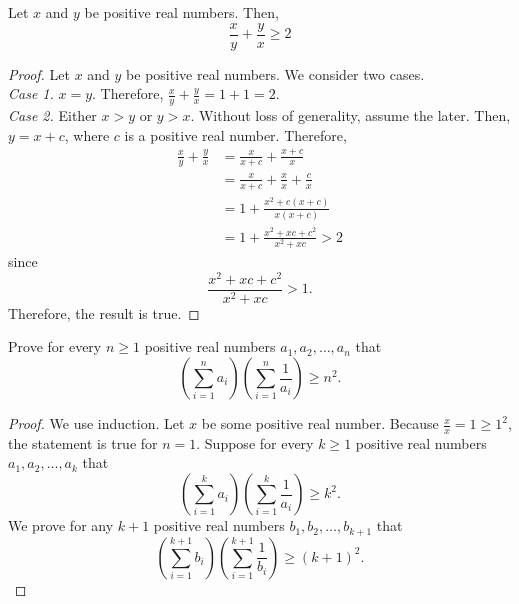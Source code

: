 \documentclass[12pt]{article}
\newenvironment{lemma}[2][Lemma]{\begin{trivlist}
		\item[\hskip \labelsep {\bfseries #1}\hskip \labelsep {\bfseries #2.}]}{\end{trivlist}}
\newenvironment{result}[2][Result]{\begin{trivlist}
		\item[\hskip \labelsep {\bfseries #1}\hskip \labelsep {\bfseries #2.}]}{\end{trivlist}}
\newenvironment{problem}[2][Problem]{\begin{trivlist}
		\item[\hskip \labelsep {\bfseries #1}\hskip \labelsep {\bfseries #2.}]}{\end{trivlist}}
\begin{document}
\begin{problem}{31}

	\begin{lemma}{2}
		Let $x$ and $y$ be positive real numbers. Then, 
		\begin{equation*}
			\frac{x}{y} + \frac{y}{x} \geq 2
		\end{equation*}
	\begin{proof}
		Let $x$ and $y$ be positive real numbers. We consider two cases.\\
		\textit{Case 1.} $x=y$. Therefore, $\frac{x}{y} + \frac{y}{x} = 1 + 1 =2$.\\
		\textit{Case 2.} Either $x>y$ or $y>x$. Without loss of generality, assume the later. Then, $y = x+c$, where $c$ is a positive real number. Therefore,
		\begin{align*}
			\frac{x}{y} + \frac{y}{x} &= \frac{x}{x+c} + \frac{x+c}{x}\\
			&= \frac{x}{x+c} + \frac{x}{x} +\frac{c}{x}\\
			&= 1+\frac{x^{2} + c(x+c)}{x(x+c)}\\
			&= 1+ \frac{x^{2}+xc + c^{2}}{x^{2} + xc} > 2
		\end{align*}
	since 
	\begin{equation*}
	\frac{x^{2}+xc+c^{2}}{x^{2}+xc}>1.
    \end{equation*} 
	Therefore, the result is true.
	\end{proof}
	\end{lemma}
\begin{result}{31}
Prove for every $n\geq 1$ positive real numbers $a_{1},a_{2},\ldots,a_{n}$ that
\begin{equation*}
	\left(\sum_{i=1}^{n}a_{i}\right)\left(\sum_{i=1}^{n}\frac{1}{a_{i}}\right)\geq n^{2}.
\end{equation*}
	\begin{proof}
		We use induction. Let $x$ be some positive real number. Because $\frac{x}{x} = 1 \geq 1^{2}$, the statement is true for $n=1$. Suppose for every $k\geq 1$ positive real numbers $a_{1},a_{2},\ldots,a_{k}$ that 
		\begin{equation*}
				\left(\sum_{i=1}^{k}a_{i}\right)\left(\sum_{i=1}^{k}\frac{1}{a_{i}}\right)\geq k^{2}.
		\end{equation*}
	We prove for any $k+1$ positive real numbers $b_{1},b_{2},\ldots, b_{k+1}$ that 
	\begin{equation*}
		\left(\sum_{i=1}^{k+1}b_{i}\right)\left(\sum_{i=1}^{k+1}\frac{1}{b_{i}}\right)\geq (k+1)^{2}.
	\end{equation*} 

\end{proof}
\end{result}
\end{problem}
\end{document}
